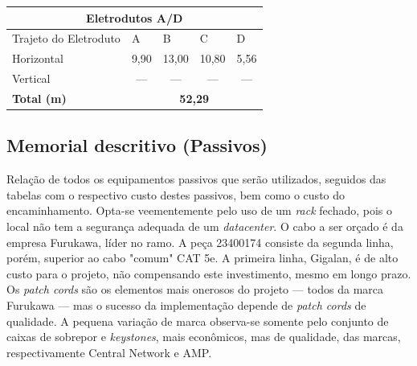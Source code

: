 \documentclass[	DIV=calc,%
							paper=a4,%
							fontsize=12pt,%
							onecolumn]{scrartcl}	 					%
\begin{document}
\begin{center}
	\renewcommand{\arraystretch}{1.5}
\begin{tabular}{|l|c|c|c|c|}
	\hline
	\multicolumn{5}{|c|}{\textbf{Eletrodutos A/D}}                                                                            \\ \hline
	Trajeto do Eletroduto & \multicolumn{1}{l|}{A} & \multicolumn{1}{l|}{B} & \multicolumn{1}{l|}{C} & \multicolumn{1}{l|}{D} \\ \hline
	Horizontal            & 9,90                   & 13,00                  & 10,80                  & 5,56                   \\ \hline
	Vertical              & ---                    & ---                    & ---                    & ---                    \\ \hline
	\textbf{Total (m)}    & \multicolumn{4}{c|}{\textbf{52,29}}                                                               \\ \hline
\end{tabular}
\end{center}


\subsection{Memorial descritivo (Passivos)}

Relação de todos os equipamentos passivos que serão utilizados, seguidos das tabelas com o respectivo custo destes passivos, bem como o custo do encaminhamento. Opta-se veementemente pelo uso de um \textit{rack} fechado, pois o local não tem a segurança adequada de um \textit{datacenter}. O cabo a ser orçado é da empresa Furukawa, líder no ramo. A peça 23400174 consiste da segunda linha, porém, superior ao cabo "comum" CAT 5e. A primeira linha, Gigalan, é de alto custo para o projeto, não compensando este investimento, mesmo em longo prazo. Os \textit{patch cords} são os elementos mais onerosos do projeto --- todos da marca Furukawa --- mas o sucesso da implementação depende de \textit{patch cords} de qualidade. A pequena variação de marca observa-se somente pelo conjunto de caixas de sobrepor e \textit{keystones}, mais econômicos, mas de qualidade, das marcas, respectivamente Central Network e AMP.
\\



\end{document}
